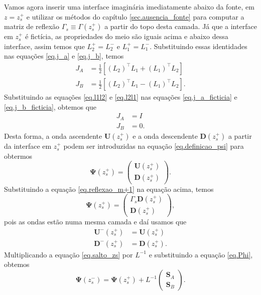 Vamos agora inserir uma interface imagin\'aria imediatamente abaixo da fonte, em $z=z_s^+$ e utilizar os m\'etodos do cap\'itulo \ref{sec.ausencia_fonte} para computar a matriz de reflex\~ao $\Gamma_s\equiv\Gamma(z_s^+)$ a partir do topo desta camada. J\'a que a interface em $z_s^+$ \'e fict\'icia, as propriedades do meio s\~ao iguais acima e abaixo dessa interface, assim temos que $L_2^+=L_2^-$ e $L_1^+=L_1^-$. Substituindo essas identidades nas equa\c{c}\~oes \ref{eq.j_a} e \ref{eq.j_b}, temos
\begin{align}\label{eq.j_a_ficticia}
J_A&=\frac{1}{2}\left[(L_2)^\top L_1+(L_1)^\top L_2\right]\\\label{eq.j_b_ficticia}
J_B&=\frac{1}{2}\left[(L_2)^\top L_1-(L_1)^\top L_2\right].
\end{align}
Substituindo as equa\c{c}\~oes \ref{eq.l1l2} e \ref{eq.l2l1} nas equa\c{c}\~oes \ref{eq.j_a_ficticia} e \ref{eq.j_b_ficticia}, obtemos que
\begin{align*}
J_A&=I\\
J_B&=0.
\end{align*}
Desta forma, a onda ascendente $\mathbf{U}(z_s^+)$ e a onda descendente $\mathbf{D}(z_s^+)$ a partir da interface em $z_s^+$ podem ser introduzidas na equa\c{c}\~ao \ref{eq.definicao_psi} para obtermos
\begin{equation*}
\mathbf{\Psi}(z_s^+)=
\begin{pmatrix}
\mathbf{U}(z_s^+)\\
\mathbf{D}(z_s^+)
\end{pmatrix}.
\end{equation*}
Substituindo a equa\c{c}\~ao \ref{eq.reflexao_m+1} na equa\c{c}\~ao acima, temos
\begin{equation}\label{eq.Psi_descendente}
\mathbf{\Psi}(z_s^+)=
\begin{pmatrix}
\Gamma_s\mathbf{D}(z_s^+)\\
\mathbf{D}(z_s^+)
\end{pmatrix},
\end{equation}
pois as ondas est\~ao numa mesma camada e da\'i usamos que
\begin{align*}
\mathbf{U}^-(z_s^+)&=\mathbf{U}(z_s^+)\\
\mathbf{D}^-(z_s^+)&=\mathbf{D}(z_s^+).
\end{align*}
Multiplicando a equa\c{c}\~ao \ref{eq.salto_zs} por $L^{-1}$ e substituindo a equa\c{c}\~ao \ref{eq.Phi}, obtemos
\begin{equation}\label{eq.Psi_salto_zs}
\mathbf{\Psi}(z_s^-)=\mathbf{\Psi}(z_s^+)+L^{-1}
\begin{pmatrix}
\mathbf{S}_A\\
\mathbf{S}_B
\end{pmatrix}.
\end{equation}
